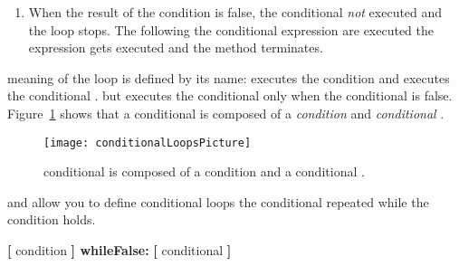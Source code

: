 {\begin{enumerate}
\item When the result of the condition \ct{[self center y \replace{>}{>=} 100]}  is false, the conditional  \textit{not} executed and the loop stops.  The  following the conditional expression are executed the expression  gets executed and the method terminates. 
\end{enumerate}

 meaning of the loop is defined by its  name:  executes the condition\add{,} and  executes the conditional .    but executes the conditional  only when the conditional is false. 
Figure~\ref{fig:conditionalLoopsPicturehere}
shows that a conditional  is composed of  a \emph{condition} and  \emph{conditional }. 

\begin{figure}[h]
\begin{center}\texttt{[image: conditionalLoopsPicture]}
\caption{  conditional  is composed of a condition and a  conditional .\label{fig:conditionalLoopsPicturehere}}
\end{center}
\end{figure}

 and  allow you to define conditional loops the conditional  repeated while the condition holds. \\
\begin{nalltt}
\textbf{[} condition \textbf{] whileFalse:}
  \textbf{[} conditional  \textbf{]}


\end{nalltt}}
